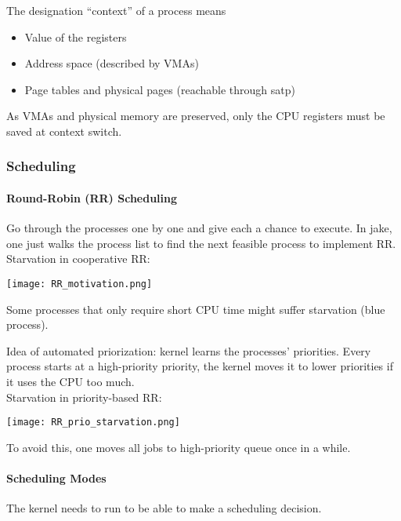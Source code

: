 \newpar{}

The designation ``context'' of a process means
\begin{itemize}
    \item Value of the registers
    \item Address space (described by VMAs)
    \item Page tables and physical pages (reachable through satp)
\end{itemize}
As VMAs and physical memory are preserved, only the CPU registers must be saved at context switch.

\subsubsection{Scheduling}
\paragraph{Round-Robin (RR) Scheduling}

Go through the processes one by one and give each a chance to execute. In jake, one just walks the process list to find the next feasible process to implement RR.\\
Starvation in cooperative RR:
\begin{center}
    \texttt{[image: RR\_motivation.png]}
\end{center}
Some processes that only require short CPU time might suffer starvation (blue process).

\newpar{}

Idea of automated priorization: kernel learns the processes' priorities. Every process starts at a high-priority priority, the kernel moves it to lower priorities if it uses the CPU too much.\\
Starvation in priority-based RR:
\begin{center}
    \texttt{[image: RR\_prio\_starvation.png]}
\end{center}
To avoid this, one moves all jobs to high-priority queue once in a while.

\paragraph{Scheduling Modes}
The kernel needs to run to be able to make a scheduling decision. 

\newpar{}

